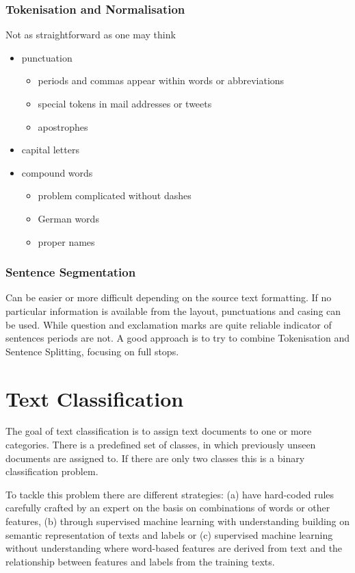 \documentclass[11pt]{article}
\begin{document}
\subsubsection{Tokenisation and Normalisation}
Not as straightforward as one may think
\begin{itemize}
	\item punctuation
	\begin{itemize}
		\item periods and commas appear within words or abbreviations
		\item special tokens in mail addresses or tweets
		\item apostrophes
	\end{itemize}
	\item capital letters
	\item compound words
	\begin{itemize}
		\item problem complicated without dashes
		\item German words
		\item proper names
	\end{itemize}
\end{itemize}

\subsubsection{Sentence Segmentation}
Can be easier or more difficult depending on the source text formatting. If no particular information is available from the layout, punctuations and casing can be used. While question and exclamation marks are quite reliable indicator of sentences periods are not. A good approach is to try to combine Tokenisation and Sentence Splitting, focusing on full stops.

\section{Text Classification}
The goal of text classification is to assign text documents to one or more categories. There is a predefined set of classes, in which previously unseen documents are assigned to. If there are only two classes this is a binary classification problem.

To tackle this problem there are different strategies: (a) have hard-coded rules carefully crafted by an expert on the basis on combinations of words or other features, (b) through supervised machine learning with understanding building on semantic representation of texts and labels or (c) supervised machine learning without understanding where word-based features are derived from text and the relationship between features and labels from the training texts.
\end{document}
